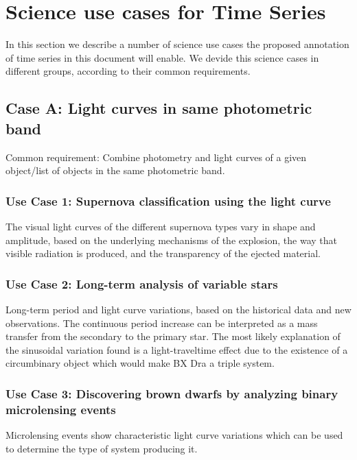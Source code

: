 \documentclass[11pt,a4paper]{ivoa}
\begin{document}
\section{Science use cases for Time Series}
In this section we describe a number of science use cases the proposed annotation of time series in this document will enable. We devide this science cases in different groups, according to their common requirements. 
\subsection{Case A: Light curves in same photometric band}
Common requirement: Combine photometry and light curves of a given object/list of objects in the same photometric band. 

\subsubsection{Use Case 1: Supernova classification using the light curve}
The visual light curves of the different supernova types vary in shape and amplitude, based on the underlying mechanisms of the explosion, the way that visible radiation is produced, and the transparency of the ejected material.
\subsubsection{Use Case 2: Long-term analysis of variable stars}
Long-term period and light curve variations, based on the historical data and new observations. The continuous period increase can be interpreted as a mass transfer from the secondary to the primary star. The most likely explanation of the sinusoidal variation found is a light-traveltime effect due to the existence of a circumbinary object which would make BX Dra a triple system.
\subsubsection{Use Case 3: Discovering brown dwarfs by analyzing binary microlensing events}
Microlensing events show characteristic light curve variations which can be used to determine the type of system producing it. %

\end{document}
